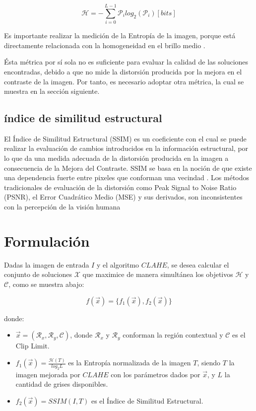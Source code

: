 \documentclass[spanish]{article}
\begin{document}
\begin{equation}\label{eq:entropia}
\mathscr{H}=-\sum_{i=0}^{L-1}\mathcal{P}_i log_2(\mathcal{P}_i) [bits]
\end{equation}

Es importante realizar la medición de la Entropía de la imagen, porque está directamente relacionada con la homogeneidad en el brillo medio \cite{108593}. 

Ésta métrica por sí sola no es suficiente para evaluar la calidad de las soluciones encontradas, debido a que no mide la distorsión producida por la mejora en el contraste de la imagen. Por tanto, es necesario adoptar otra métrica, la cual se muestra en la sección siguiente. 

\subsection{índice de similitud estructural}
\label{ssec:ssim}

El Índice de Similitud Estructural (SSIM) es un coeficiente con el cual se puede realizar la evaluación de cambios introducidos en la información estructural, por lo que da una medida adecuada de la distorsión producida en la imagen a consecuencia de la Mejora del Contraste. SSIM se basa en la noción de que existe una dependencia fuerte entre pixeles que conforman una vecindad \cite{kwok2013locally}. Los métodos tradicionales de evaluación de la distorsión como Peak Signal to Noise Ratio (PSNR), el Error Cuadrático Medio (MSE) y sus derivados, son inconsistentes con la percepción de la visión humana \cite{}

\section{Formulación}
\label{sec:formulacion}

Dadas la imagen de entrada $I$ y el algoritmo $CLAHE$, se desea calcular el conjunto de soluciones $\mathscr{X}$ que maximice de manera simultánea los objetivos $\mathscr{H}$ y $\mathcal{C}$, como se muestra abajo:

\begin{equation}\label{eq:fitness}
    f(\overrightarrow{x}) = \{ f_1(\overrightarrow{x}), f_2(\overrightarrow{x}) \}
\end{equation}

donde:
\begin{itemize}
\item $\overrightarrow{x}=(\mathcal{R}_x, \mathcal{R}_y, \mathcal{C})$, donde $\mathcal{R}_x$ y $\mathcal{R}_y$ conforman la región contextual y $\mathscr{C}$ es el Clip Limit.
\item $f_{1}(\overrightarrow{x})=\frac{\mathscr{H}(T)}{log_{2}L}$ es la Entropía normalizada de la imagen $T$, siendo $T$ la imagen mejorada por $CLAHE$ con los parámetros dados por $\overrightarrow{x}$, y $L$ la cantidad de grises disponibles.
\item $f_{2}(\overrightarrow{x})=SSIM(I,T)$ es el Índice de Similitud Estructural.
\end{itemize}
\end{document}
